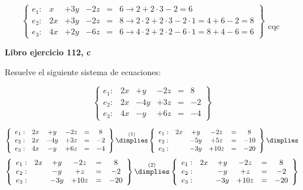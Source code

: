 \documentclass[palatino,nosec]{Docencia}
\begin{document}
\begin{problem}
\[
\left\{\begin{array}{lccccl}
e_1: &x&+3y&-2z&=&6 \to 2+2·3-2 = 6\\
e_2: &2x&+3y&-2z&=&8 \to 2·2 + 2·3-2·1 = 4+6-2 = 8\\
e_3: &4x&+2y&-6z&=&6 \to 4·2+2·2-6·1 = 8+4-6 = 6  
\end{array}\right\} \begin{array}{c}\\\\\\\\\text{cqc}\end{array}
\]
\end{problem}


\newpage
\begin{problem}
\textbf{Libro ejercicio 112, c}

Resuelve el siguiente sistema de ecuaciones:

\[
\left\{\begin{array}{lccccc}
e_1: &	2x &	+	y &		- 2z &	= & 8 \\
e_2: &	2x &	-	4y &	+ 3z &	= & -2 \\
e_3: &	4x &	-	y &		+ 6z &	= & -4 
\end{array}\right\}
\]

\solution


\[
\left\{\begin{array}{lccccc}
e_1: &	2x &	+	y &		- 2z &	= & 8 \\
e_2: &	2x &	-	4y &	+ 3z &	= & -2 \\
e_3: &	4x &	-	y &		+ 6z &	= & -4 
\end{array}\right\}
\overset{(1)}{\dimplies}
\left\{\begin{array}{lccccc}
e_1: &	2x &	+	y &		- 2z &	= & 8 \\
e_2: &	   &	-	5y &	+ 5z &	= & -10\\
e_3: &	   &	-	3y &	+ 10z &	= & -20\\
\end{array}\right\}
\dimplies\]
\[
\left\{\begin{array}{lccccc}
e_1: &	2x &	+	y &		- 2z &	= & 8 \\
e_2: &	   &	-	y &		+  z &	= & -2\\
e_3: &	   &	-	3y &	+ 10z &	= & -20\\
\end{array}\right\}
\overset{(2)}{\dimplies}
\left\{\begin{array}{lccccc}
e_1: &	2x &	+	y &		- 2z &	= & 8 \\
e_2: &	   &	-	y &		+  z &	= & -2\\
e_3: &	   &	-	3y &	+ 10z &	= & -20\\
\end{array}\right\}
\]



\end{problem}
\end{document}
